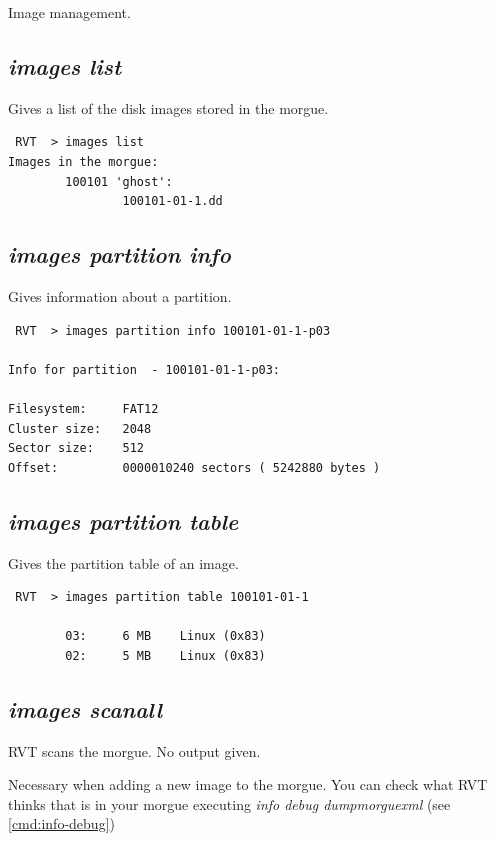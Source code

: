 \documentclass[a4paper,11pt,oneside]{report}
\begin{document}
Image management.



\subsection{\emph{images list}}

Gives a list of the disk images stored in the morgue.

\begin{verbatim}
 RVT  > images list
Images in the morgue: 
        100101 'ghost':
                100101-01-1.dd

\end{verbatim}



\subsection{\emph{images partition info}}

Gives information about a partition.

\begin{verbatim}
 RVT  > images partition info 100101-01-1-p03                                 

Info for partition  - 100101-01-1-p03:

Filesystem:     FAT12
Cluster size:   2048
Sector size:    512
Offset:         0000010240 sectors ( 5242880 bytes )
\end{verbatim}

\subsection{\emph{images partition table}}

Gives the partition table of an image.

\begin{verbatim}
 RVT  > images partition table 100101-01-1

        03:     6 MB    Linux (0x83)
        02:     5 MB    Linux (0x83)
\end{verbatim}


\subsection{\emph{images scanall}}

RVT scans the morgue. No output given. 

Necessary when adding a new image to the morgue. You can check what RVT thinks that is in your morgue executing \emph{info debug dumpmorguexml} (see \ref{cmd:info-debug})
\end{document}
